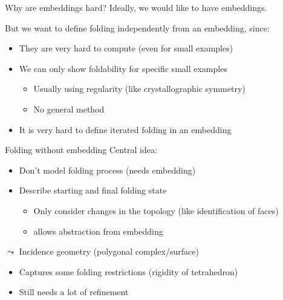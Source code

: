 \begin{frame}{Why are embeddings hard?}
    \pause
    Ideally, we would like to have embeddings.
    
    \pause
    But we want to define folding independently from an embedding, since:

    \begin{itemize}
        \pause
        \item They are very hard to compute (even for small examples)
        \pause
        \item We can only show foldability for specific small examples
            \begin{itemize}
                \pause
                \item Usually using regularity (like crystallographic symmetry)
                \pause
                \item No general method
            \end{itemize}
        \pause
        \item It is very hard to define iterated folding in an embedding
    \end{itemize}

    \pause
    \begin{center}
    \end{center}

\end{frame}


\begin{frame}{Folding without embedding}
    \pause
    Central idea:
    \begin{itemize}
        \pause
        \item Don't model folding process (needs embedding)
        \pause
        \item Describe starting and final folding state
            \begin{itemize}
                \pause
                \item Only consider changes in the topology
                    \pause (like identification of faces)
                \pause
                \item allows abstraction from embedding
            \end{itemize}
    \end{itemize}


    \pause
    $\leadsto$ Incidence geometry (polygonal complex/surface)

    \begin{itemize}
        \pause
        \item Captures some folding restrictions \pause (rigidity of tetrahedron)
        \pause
        \item Still needs a lot of refinement
    \end{itemize}
\end{frame}

